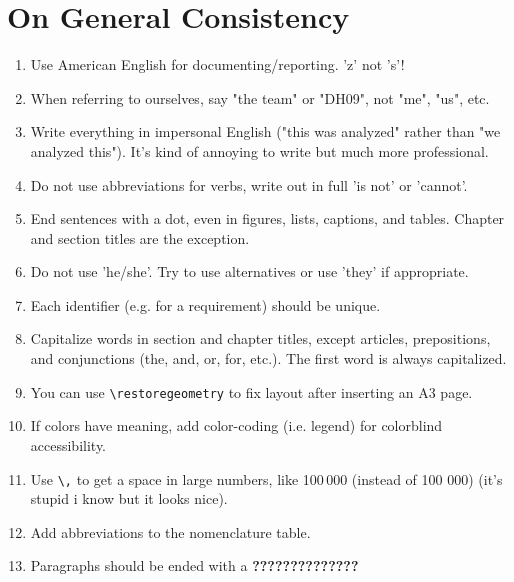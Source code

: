 \section*{On General Consistency}
\label{sec:general-consistency}
\begin{enumerate}[label=G.\arabic*]
    \item Use American English for documenting/reporting. 'z' not 's'!
    \item When referring to ourselves, say "the team" or "DH09", not "me", "us", etc.
    \item Write everything in impersonal English ("this was analyzed" rather than "we analyzed this"). It's kind of annoying to write but much more professional.
    \item Do not use abbreviations for verbs, write out in full 'is not' or 'cannot'.
    \item End sentences with a dot, even in figures, lists, captions, and tables. Chapter and section titles are the exception.
    \item Do not use 'he/she'. Try to use alternatives or use 'they' if appropriate.
    \item Each identifier (e.g. for a requirement) should be unique. %
    \item Capitalize words in section and chapter titles, except articles, prepositions, and conjunctions (the, and, or, for, etc.). The first word is always capitalized.
    \item You can use \verb|\restoregeometry| to fix layout after inserting an A3 page.
    \item If colors have meaning, add color-coding (i.e. legend) for colorblind accessibility.
    \item Use \verb|\,| to get a space in large numbers, like 100\,000 (instead of 100 000) (it's stupid i know but it looks nice).
    \item Add abbreviations to the nomenclature table. 
    \item Paragraphs should be ended with a \textbf{??????????????} 
\end{enumerate}
